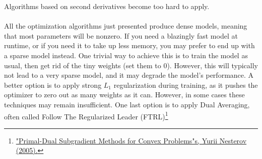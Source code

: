 Algorithms based on second derivatives become too hard to apply.

\paragraph{} All the optimization algorithms just presented produce dense models, meaning that most parameters will be nonzero. If you need a blazingly fast model at runtime, or if you need it to take up less memory, you may prefer to end up with a sparse model instead. One trivial way to achieve this is to train the model as usual, then get rid of the tiny weights (set them to 0). However, this will typically not lead to a very sparse model, and it may degrade the model's performance. A better option is to apply strong $L_1$ regularization during training, as it pushes the optimizer to zero out as many weights as it can. However, in some cases these techniques may remain insufficient. One last option is to apply Dual Averaging, often called Follow The Regularized Leader (FTRL)\footnote{\href{However, in some cases these techniques may remain insufficient. One last option is to apply Dual Averaging, often called Follow The Regularized Leader (FTRL)}{"Primal-Dual Subgradient Methods for Convex Problems"s, Yurii Nesterov (2005).}}

